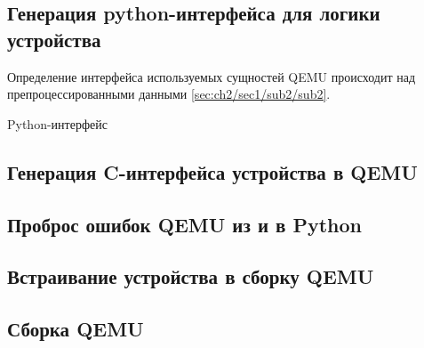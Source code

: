 \subsection{Генерация python-интерфейса для логики устройства}\label{sec:ch2/sec1/sub3}

Определение интерфейса используемых сущностей QEMU происходит над препроцессированными данными \ref{sec:ch2/sec1/sub2/sub2}.



Python-интерфейс 

\subsection{Генерация C-интерфейса устройства в QEMU}\label{sec:ch2/sec1/sub4}

\lipsum[1-40]
\subsection{Проброс ошибок QEMU из и в Python}\label{sec:ch2/sec1/sub5}
\lipsum[1-40]
\subsection{Встраивание устройства в сборку QEMU}\label{sec:ch2/sec1/sub6}
\lipsum[1-40]
\subsection{Сборка QEMU}\label{sec:ch2/sec1/sub7}
\lipsum[1-40]

